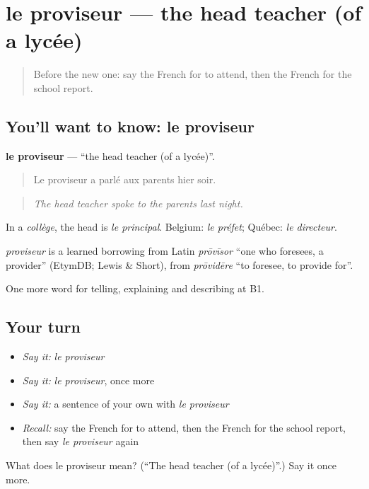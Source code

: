 \section[le proviseur]{le proviseur — the head teacher (of a lycée)}

\label{lesson:FR-C375-proviseur}



\begin{quote}
Before the new one: say the French for to attend, then the French for the school report.
\end{quote}

\subsection*{You'll want to know: le proviseur}
\textbf{le proviseur} — \textquotedblleft{}the head teacher (of a lycée)\textquotedblright{}.

\begin{quote}
Le proviseur a parlé aux parents hier soir.
\end{quote}

\begin{quote}
\emph{The head teacher spoke to the parents last night.}
\end{quote}

In a \emph{collège}, the head is \emph{le principal}. Belgium: \emph{le préfet}; Québec: \emph{le directeur}.

\begin{cousinweb}
\emph{proviseur} is a learned borrowing from Latin \emph{prōvīsor} \textquotedblleft{}one who foresees, a provider\textquotedblright{} (EtymDB; Lewis \& Short), from \emph{prōvidēre} \textquotedblleft{}to foresee, to provide for\textquotedblright{}.
\end{cousinweb}

\begin{grammarlens}[title={What you've built}]
One more word for telling, explaining and describing at B1.
\end{grammarlens}

\subsection*{Your turn}
\begin{itemize}
\raggedright
  \item \emph{Say it:} \emph{le proviseur}
  \item \emph{Say it:} \emph{le proviseur}, once more
  \item \emph{Say it:} a sentence of your own with \emph{le proviseur}
  \item \emph{Recall:} say the French for to attend, then the French for the school report, then say \emph{le proviseur} again
\end{itemize}

\begin{tcolorbox}[breakable,colback=teal!4,colframe=teal!35!black,title={Before you move on}]
What does le proviseur mean? (\textquotedblleft{}The head teacher (of a lycée)\textquotedblright{}.) Say it once more.
\end{tcolorbox}
